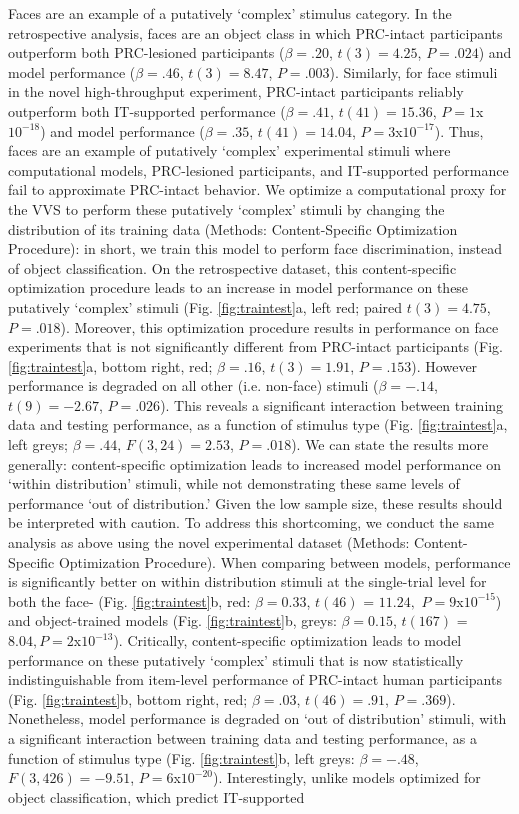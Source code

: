 \documentclass[11pt]{article}
\begin{document}
Faces are an example of a putatively `complex' stimulus category. In the retrospective analysis, faces are an object class in which PRC-intact participants outperform both PRC-lesioned participants ($\beta = .20$, $t(3) = 4.25$, $P = .024$) and model performance ($\beta = .46$, $t(3) = 8.47$, $P = .003$). Similarly, for face stimuli in the novel high-throughput experiment, PRC-intact participants reliably outperform both IT-supported performance ($\beta = .41$, $t(41) = 15.36$, $P = 1$x$10^{-18}$) and model performance ($\beta = .35$, $t(41) = 14.04$, $P = 3$x$10^{-17}$). Thus, faces are an example of putatively ‘complex’ experimental stimuli where computational models, PRC-lesioned participants, and IT-supported performance fail to approximate PRC-intact behavior. We optimize a computational proxy for the VVS to perform these putatively ‘complex’ stimuli by changing the distribution of its training data (Methods: Content-Specific Optimization Procedure): in short, we train this model to perform face discrimination, instead of object classification. On the retrospective dataset, this content-specific optimization procedure leads to an increase in model performance on these putatively `complex' stimuli (Fig. \ref{fig:traintest}a, left red; paired $t(3) = 4.75$, $P = .018$). Moreover, this optimization procedure results in performance on face experiments that is not significantly different from PRC-intact participants (Fig. \ref{fig:traintest}a, bottom right, red; $\beta = .16$, $t(3) = 1.91$, $P = .153$). However performance is degraded on all other (i.e. non-face) stimuli ($\beta = -.14$, $t(9) = -2.67$, $P = .026$). This reveals a significant interaction between training data and testing performance, as a function of stimulus type (Fig. \ref{fig:traintest}a, left greys; $\beta = .44$, $F(3,24) = 2.53$, $P = .018$). We can state the results more generally: content-specific optimization leads to increased model performance on ‘within distribution’ stimuli, while not demonstrating these same levels of performance `out of distribution.' Given the low sample size, these results should be interpreted with caution. To address this shortcoming, we conduct the same analysis as above using the novel experimental dataset (Methods: Content-Specific Optimization Procedure). When comparing between models, performance is significantly better on within distribution stimuli at the single-trial level for both the face- (Fig. \ref{fig:traintest}b, red: $\beta = 0.33$, $t(46)$ = $11.24,$ $P = 9$x$10 ^{-15}$) and object-trained models (Fig. \ref{fig:traintest}b, greys: $\beta = 0.15$, $t(167)$ = $8.04, P = 2$x$10 ^{-13}$). Critically, content-specific optimization leads to model performance on these putatively `complex' stimuli that is now statistically indistinguishable from item-level performance of PRC-intact human participants (Fig. \ref{fig:traintest}b, bottom right, red; $\beta = .03$, $t(46) = .91$, $P = .369$). Nonetheless, model performance is degraded on ‘out of distribution’ stimuli, with a significant interaction between training data and testing performance, as a function of stimulus type (Fig. \ref{fig:traintest}b, left greys: $\beta = -.48$, $F(3,426) = -9.51$, $P = 6$x$10^{-20}$). Interestingly, unlike models optimized for object classification, which predict IT-supported 
\end{document}
